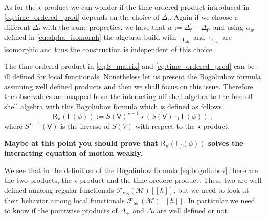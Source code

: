 \documentclass[11pt]{book}
\newcommand{\com}[1]{{\color{red}\bf #1}}
\newcommand{\loc}{\mathsf{loc}}
\newcommand{\reg}{\mathsf{reg}}
\newcommand{\Fcal}{\mathcal{F}}
\newcommand{\Mcal}{\mathcal{M}}
\newcommand{\Fsf}{\mathsf{F}}
\newcommand{\Rsf}{\mathsf{R}}
\newcommand{\Tsf}{\mathsf{T}}
\newcommand{\Vsf}{\mathsf{V}}
\newcommand{\fsf}{\mathsf{f}}
\theoremstyle{break}
\begin{document}
\bigskip



As for the $\star$ product we can wonder if the time ordered product introduced in \eqref{eq:time_ordered_prod} depends on the choice of $\Delta_\fsf$. Again if we choose a different $\Delta^\prime_\fsf$ with the same properties, we have that $w:=\Delta^\prime_\fsf - \Delta_\fsf$, and using $\alpha_{w}$ defined in \eqref{eq:alpha_isomorph} the algebras build with $\cdot_{\Tsf_{\Delta_\fsf}}$ and $\cdot_{\Tsf_{\Delta^\prime_\fsf}}$ are isomorphic and thus the construction is independent of this choice. 


\bigskip


The time ordered product in \eqref{eq:S_matrix} and \eqref{eq:time_ordered_prod} can be ill defined for local functionals. Nonetheless let us present the Bogoliubov formula  assuming well defined products and then we shall focus on this issue. Therefore the observables are mapped from the interacting off shell algebra to the free off shell algebra with this Bogoliubov formula which is defined as follows
%
\begin{equation}
\Rsf_\Vsf(\Fsf(\phi)) := S(\Vsf)^{\star-1} \star \left( S(\Vsf) \cdot_\Tsf \Fsf(\phi) \right) \ ,
\label{eq:bogoliubov}
\end{equation}
%
where $S^{\star-1}(\Vsf)$ is the inverse of $S(V)$ with respect to the $\star$ product. 


\bigskip
\com{Maybe at this point you should prove that $\Rsf_\Vsf(\Fsf_f(\phi))$ solves the interacting equation of motion weakly.}
\bigskip



We see that in the definition of the Bogoliubov formula \eqref{eq:bogoliubov} there are the two products, the $\star$ product and the time oredere product. These two are well defined amaong regular functionals $\Fcal_\reg(\Mcal)[[\hbar]]$, but we need to look at their behavior among local functionals $\Fcal_\loc(\Mcal)[[\hbar]]$. In particular we need to know if the pointwise products of $\Delta_+$ and $\Delta_\fsf$ are well defined or not.
\end{document}
